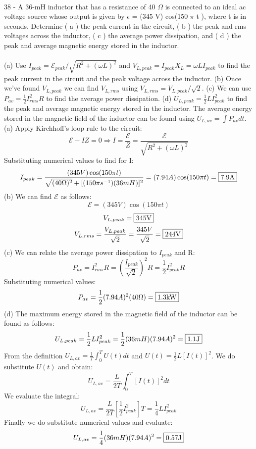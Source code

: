 \documentclass{report}
\begin{document}
\paragraph{}
38 - A 36-mH inductor that has a resistance of 40 $\Omega$ is connected to an ideal ac voltage source whose output is given by $\epsilon$ = (345 V) cos(150 $\pi$ t ), where t is in seconds. Determine ( a ) the peak current in the circuit, ( b ) the peak and rms voltages across the inductor, ( c ) the average power dissipation, and ( d ) the peak and average magnetic energy stored in the inductor.\\
\\
(a) Use $I_{peak} = \mathcal{E}_{peak}/\sqrt{R^2 + (\omega L)^2}$ and $V_{L,peak} = I_{peak}X_L = \omega LI_{peak}$ to find the peak current in the circuit and the peak voltage across the inductor. (b) Once we've found $V_{L,peak}$ we can find $V_{L,rms}$ using $V_{L,rms} = V_{L,peak} / \sqrt{2}$. (c) We can use $P_{av} = \frac{1}{2}I^2_{rms}R$ to find the average power dissipation. (d) $U_{L,peak} = \frac{1}{2}LI_{peak}^2$ to find the peak and average magnetic energy stored in the inductor. The average energy stored in the magnetic field of the inductor can be found using $U_{L,av} = \int P_{av}dt$.\\
(a) Apply Kirchhoff's loop rule to the circuit:
$$\mathcal{E} - IZ = 0 \Rightarrow I = \frac{\mathcal{E}}{Z} = \frac{\mathcal{E}}{\sqrt{R^2 + (\omega L)^2}}$$
Substituting numerical values to find for I:
$$I_{peak} = \frac{(345V)\cos (150 \pi t)}{\sqrt{(40\Omega)^2} + [(150\pi s^{-1})(36mH)]^2} = (7.94A)\cos (150\pi t) = \fbox{7.9A}$$
(b) We can find $\mathcal{E}$ as follows:
$$\mathcal{E} = (345V) \cos (150 \pi t)$$
$$V_{L,peak} = \fbox{345V}$$
$$V_{L,rms} = \frac{V_{L,peak}}{\sqrt{2}} = \frac{345V}{\sqrt{2}} = \fbox{244V}$$
(c) We can relate the average power dissipation to $I_{peak}$ and R:
$$P_{av} = I_{rms}^2R = \left( \frac{I_{peak}}{\sqrt{2}} \right)^2R = \frac{1}{2}I_{peak}^2R$$
Substituting numerical values:
$$P_{av} = \frac{1}{2}(7.94A)^2(40\Omega) = \fbox{1.3kW}$$
(d) The maximum energy stored in the magnetic field of the inductor can be found as follows:
$$U_{L,peak} = \frac{1}{2}LI_{peak}^2 = \frac{1}{2}(36mH)(7.94A)^2 = \fbox{1.1J}$$
From the definition $U_{L,av} = \frac{1}{T}\int_0^TU(t)dt$ and $U(t) = \frac{1}{2}L[I(t)]^2$. We do substitute $U(t)$ and obtain:
$$U_{L,av} = \frac{L}{2T}\int_0^T[I(t)]^2dt$$
We evaluate the integral:
$$U_{L,av} = \frac{L}{2T}\left[ \frac{1}{2}I_{peak}^2\right]T = \frac{1}{4}LI_{peak}^2$$
Finally we do substitute numerical values and evaluate:
$$U_{L,av} = \frac{1}{4}(36mH)(7.94A)^2 = \fbox{0.57J}$$
\end{document}
